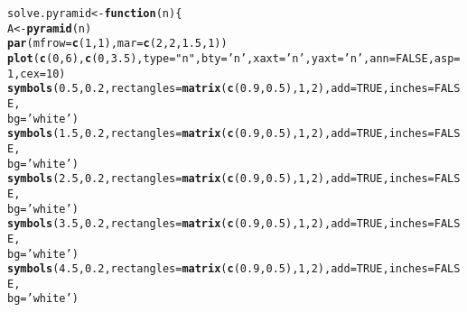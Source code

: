 \documentclass[12pt]{article}\usepackage[]{graphicx}\usepackage[]{color}
\makeatletter
\newcommand{\hlnum}[1]{\textcolor[rgb]{0.686,0.059,0.569}{#1}}%
\newcommand{\hlstr}[1]{\textcolor[rgb]{0.192,0.494,0.8}{#1}}%
\newcommand{\hlstd}[1]{\textcolor[rgb]{0.345,0.345,0.345}{#1}}%
\newcommand{\hlkwa}[1]{\textcolor[rgb]{0.161,0.373,0.58}{\textbf{#1}}}%
\newcommand{\hlkwb}[1]{\textcolor[rgb]{0.69,0.353,0.396}{#1}}%
\newcommand{\hlkwc}[1]{\textcolor[rgb]{0.333,0.667,0.333}{#1}}%
\newcommand{\hlkwd}[1]{\textcolor[rgb]{0.737,0.353,0.396}{\textbf{#1}}}%
\newenvironment{kframe}{%
 \def\at@end@of@kframe{}%
 \ifinner\ifhmode%
  \def\at@end@of@kframe{\end{minipage}}%
  \begin{minipage}{\columnwidth}%
 \fi\fi%
 \def\FrameCommand##1{\hskip\@totalleftmargin \hskip-\fboxsep
 \colorbox{shadecolor}{##1}\hskip-\fboxsep
     \hskip-\linewidth \hskip-\@totalleftmargin \hskip\columnwidth}%
 \MakeFramed {\advance\hsize-\width
   \@totalleftmargin\z@ \linewidth\hsize
   \@setminipage}}%
 {\par\unskip\endMakeFramed%
 \at@end@of@kframe}
\newenvironment{knitrout}{}{} %
\makeatother
\begin{document}
\begin{knitrout}
\begin{kframe}
\begin{alltt}
\hlstd{solve.pyramid} \hlkwb{<-} \hlkwa{function}\hlstd{(}\hlkwc{n}\hlstd{)\{}
  \hlstd{A} \hlkwb{<-} \hlkwd{pyramid}\hlstd{(n)}
  \hlkwd{par}\hlstd{(}\hlkwc{mfrow}\hlstd{=}\hlkwd{c}\hlstd{(}\hlnum{1}\hlstd{,} \hlnum{1}\hlstd{),} \hlkwc{mar}\hlstd{=}\hlkwd{c}\hlstd{(}\hlnum{2}\hlstd{,} \hlnum{2}\hlstd{,} \hlnum{1.5}\hlstd{,} \hlnum{1}\hlstd{))}
  \hlkwd{plot}\hlstd{(}\hlkwd{c}\hlstd{(}\hlnum{0}\hlstd{,} \hlnum{6}\hlstd{),}\hlkwd{c}\hlstd{(}\hlnum{0}\hlstd{,} \hlnum{3.5}\hlstd{),}\hlkwc{type}\hlstd{=}\hlstr{"n"}\hlstd{,}\hlkwc{bty}\hlstd{=}\hlstr{'n'}\hlstd{,}\hlkwc{xaxt}\hlstd{=}\hlstr{'n'}\hlstd{,}\hlkwc{yaxt}\hlstd{=}\hlstr{'n'}\hlstd{,}\hlkwc{ann}\hlstd{=}\hlnum{FALSE}\hlstd{,}\hlkwc{asp}\hlstd{=}\hlnum{1}\hlstd{,}\hlkwc{cex}\hlstd{=}\hlnum{10}\hlstd{)}
  \hlkwd{symbols}\hlstd{(}\hlnum{0.5}\hlstd{,} \hlnum{0.2}\hlstd{,} \hlkwc{rectangles} \hlstd{=} \hlkwd{matrix}\hlstd{(}\hlkwd{c}\hlstd{(}\hlnum{0.9}\hlstd{,} \hlnum{0.5}\hlstd{),} \hlnum{1}\hlstd{,} \hlnum{2}\hlstd{),} \hlkwc{add} \hlstd{=} \hlnum{TRUE}\hlstd{,} \hlkwc{inches} \hlstd{=} \hlnum{FALSE}\hlstd{,}
          \hlkwc{bg} \hlstd{=} \hlstr{'white'}\hlstd{)}
  \hlkwd{symbols}\hlstd{(}\hlnum{1.5}\hlstd{,} \hlnum{0.2}\hlstd{,} \hlkwc{rectangles} \hlstd{=} \hlkwd{matrix}\hlstd{(}\hlkwd{c}\hlstd{(}\hlnum{0.9}\hlstd{,} \hlnum{0.5}\hlstd{),} \hlnum{1}\hlstd{,} \hlnum{2}\hlstd{),} \hlkwc{add} \hlstd{=} \hlnum{TRUE}\hlstd{,} \hlkwc{inches} \hlstd{=} \hlnum{FALSE}\hlstd{,}
          \hlkwc{bg} \hlstd{=} \hlstr{'white'}\hlstd{)}
  \hlkwd{symbols}\hlstd{(}\hlnum{2.5}\hlstd{,} \hlnum{0.2}\hlstd{,} \hlkwc{rectangles} \hlstd{=} \hlkwd{matrix}\hlstd{(}\hlkwd{c}\hlstd{(}\hlnum{0.9}\hlstd{,} \hlnum{0.5}\hlstd{),} \hlnum{1}\hlstd{,} \hlnum{2}\hlstd{),} \hlkwc{add} \hlstd{=} \hlnum{TRUE}\hlstd{,} \hlkwc{inches} \hlstd{=} \hlnum{FALSE}\hlstd{,}
          \hlkwc{bg} \hlstd{=} \hlstr{'white'}\hlstd{)}
  \hlkwd{symbols}\hlstd{(}\hlnum{3.5}\hlstd{,} \hlnum{0.2}\hlstd{,} \hlkwc{rectangles} \hlstd{=} \hlkwd{matrix}\hlstd{(}\hlkwd{c}\hlstd{(}\hlnum{0.9}\hlstd{,} \hlnum{0.5}\hlstd{),} \hlnum{1}\hlstd{,} \hlnum{2}\hlstd{),} \hlkwc{add} \hlstd{=} \hlnum{TRUE}\hlstd{,} \hlkwc{inches} \hlstd{=} \hlnum{FALSE}\hlstd{,}
          \hlkwc{bg} \hlstd{=} \hlstr{'white'}\hlstd{)}
  \hlkwd{symbols}\hlstd{(}\hlnum{4.5}\hlstd{,} \hlnum{0.2}\hlstd{,} \hlkwc{rectangles} \hlstd{=} \hlkwd{matrix}\hlstd{(}\hlkwd{c}\hlstd{(}\hlnum{0.9}\hlstd{,} \hlnum{0.5}\hlstd{),} \hlnum{1}\hlstd{,} \hlnum{2}\hlstd{),} \hlkwc{add} \hlstd{=} \hlnum{TRUE}\hlstd{,} \hlkwc{inches} \hlstd{=} \hlnum{FALSE}\hlstd{,}
          \hlkwc{bg} \hlstd{=} \hlstr{'white'}\hlstd{)}

\end{alltt}
\end{kframe}
\end{knitrout}
\end{document}

